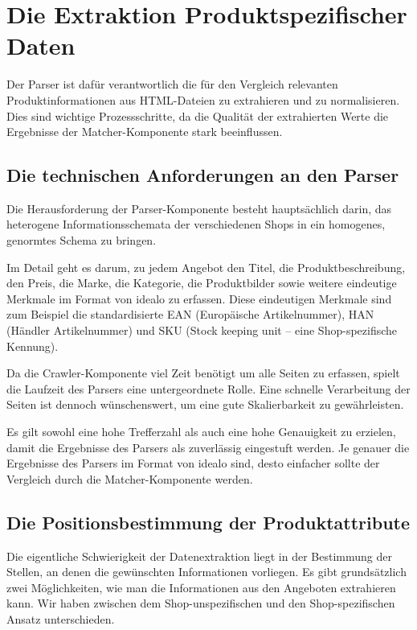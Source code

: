 \section{Die Extraktion Produktspezifischer Daten}
\label{sec:extraktion-produktspezifischer-daten}

Der Parser ist dafür verantwortlich die für den Vergleich relevanten Produktinformationen aus HTML-Dateien zu
extrahieren und zu normalisieren.
Dies sind wichtige Prozessschritte, da die Qualität der extrahierten Werte die Ergebnisse der Matcher-Komponente
stark beeinflussen.

\subsection{Die technischen Anforderungen an den Parser}
\label{subsec:technische-anforderungen-parser}

Die Herausforderung der Parser-Komponente besteht hauptsächlich darin, das heterogene Informationsschemata der
verschiedenen Shops in ein homogenes, genormtes Schema zu bringen.

Im Detail geht es darum, zu jedem Angebot den Titel, die Produktbeschreibung, den Preis, die Marke, die Kategorie,
die Produktbilder sowie weitere eindeutige Merkmale im Format von idealo zu erfassen.
Diese eindeutigen Merkmale sind zum Beispiel die standardisierte EAN (Europäische Artikelnummer), HAN (Händler
Artikelnummer) und SKU (Stock keeping unit -- eine Shop-spezifische Kennung).

Da die Crawler-Komponente viel Zeit benötigt um alle Seiten zu erfassen, spielt die Laufzeit des Parsers eine
untergeordnete Rolle.
Eine schnelle Verarbeitung der Seiten ist dennoch wünschenswert, um eine gute Skalierbarkeit zu gewährleisten.

Es gilt sowohl eine hohe Trefferzahl als auch eine hohe Genauigkeit zu erzielen, damit die  Ergebnisse des Parsers
als zuverlässig eingestuft werden.
Je genauer die Ergebnisse des Parsers im Format von idealo sind, desto einfacher sollte der Vergleich durch die
Matcher-Komponente werden.

\subsection{Die Positionsbestimmung der Produktattribute}
\label{subsec:herangehensweisen}

Die eigentliche Schwierigkeit der Datenextraktion liegt in der Bestimmung der Stellen, an denen die gewünschten
Informationen vorliegen.
Es gibt grundsätzlich zwei Möglichkeiten, wie man die Informationen aus den Angeboten extrahieren kann.
Wir haben zwischen dem Shop-unspezifischen und den Shop-spezifischen Ansatz unterschieden.

